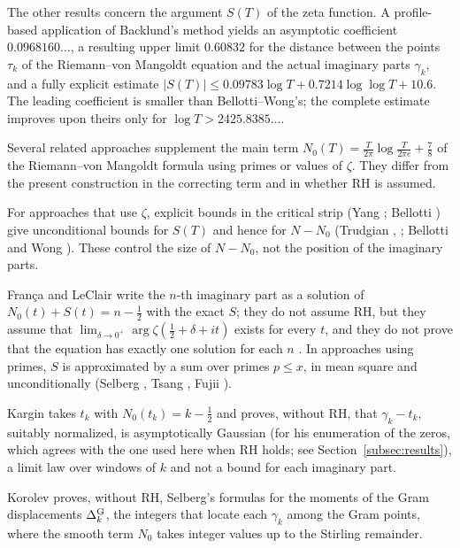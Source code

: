 \documentclass[11pt,a4paper]{article}
\makeatletter
\numberwithin{equation}{section}
\DeclareRobustCommand{\CGref}[1]{\ref{#1}}
\DeclareRobustCommand{\CGcite}[2][]{\if\relax\detokenize{#1}\relax\cite{#2}\else\cite[#1]{#2}\fi}
\let\CG@origref\ref
\newcommand{\CG@gettip}[1]{\@ifundefined{CGTip@#1}{#1}{\csname CGTip@#1\endcsname}}
\newcommand{\CG@getbib}[1]{\@ifundefined{CGBib@#1}{#1}{\csname CGBib@#1\endcsname}}
\DeclareRobustCommand{\CGref}[1]{\pdftooltip{\CG@origref{#1}}{\CG@gettip{#1}}}
\DeclareRobustCommand{\CGcite}[2][]{\pdftooltip{\if\relax\detokenize{#1}\relax\cite{#2}\else\cite[#1]{#2}\fi}{\CG@getbib{#2}}}
\theoremstyle{definition}
\theoremstyle{remark}
\newcommand{\Nz}{N_0} %
\makeatother
\begin{document}
The other results concern the argument $S(T)$ of the zeta function. A profile-based application of Backlund's method yields an asymptotic coefficient $0.0968160\ldots$, a resulting upper limit $0.60832$ for the distance between the points $\tau_k$ of the Riemann--von Mangoldt equation and the actual imaginary parts $\gamma_k$, and a fully explicit estimate $|S(T)|\le0.09783\log T+0.7214\log\log T+10.6$. The leading coefficient is smaller than Bellotti--Wong's; the complete estimate improves upon theirs only for $\log T>2425.8385\ldots$.

Several related approaches supplement the main term $\Nz(T)=\frac{T}{2\pi}\log\frac{T}{2\pi e}+\frac78$ of the Riemann--von Mangoldt formula using primes or values of $\zeta$. They differ from the present construction in the correcting term and in whether RH is assumed.

For approaches that use $\zeta$, explicit bounds in the critical strip (Yang \CGcite{Yang2024}; Bellotti \CGcite{Bellotti2024}) give unconditional bounds for $S(T)$ and hence for $N-\Nz$ (Trudgian \CGcite{Trudgian2012}, \CGcite{Trudgian2014}; Bellotti and Wong \CGcite[Thm.~1.1, Cor.~1.5]{BellottiWong2025}). These control the size of $N-\Nz$, not the position of the imaginary parts.

Fran\c{c}a and LeClair \CGcite[eq.~(20)]{FrancaLeClair2015} write the $n$-th imaginary part as a solution of $\Nz(t)+S(t)=n-\frac12$ with the exact $S$; they do not assume RH, but they assume that $\lim_{\delta\to0^+}\arg\zeta(\frac12+\delta+it)$ exists for every $t$, and they do not prove that the equation has exactly one solution for each $n$ \CGcite[\S9]{FrancaLeClair2015}. In approaches using primes, $S$ is approximated by a sum over primes $p\le x$, in mean square and unconditionally (Selberg \CGcite{Selberg1946a}, Tsang \CGcite{Tsang1984}, Fujii \CGcite{Fujii1974}).

Kargin \CGcite[Thm.~1.1]{Kargin2013} takes $t_k$ with $\Nz(t_k)=k-\frac12$ and proves, without RH, that $\gamma_k-t_k$, suitably normalized, is asymptotically Gaussian (for his enumeration of the zeros, which agrees with the one used here when RH holds; see Section~\CGref{subsec:results}), a limit law over windows of $k$ and not a bound for each imaginary part.

Korolev \CGcite[Thm.~4.2]{Korolev2012} proves, without RH, Selberg's formulas for the moments of the Gram displacements $\Delta^{\rm G}_k$, the integers that locate each $\gamma_k$ among the Gram points, where the smooth term $\Nz$ takes integer values up to the Stirling remainder.
\end{document}
